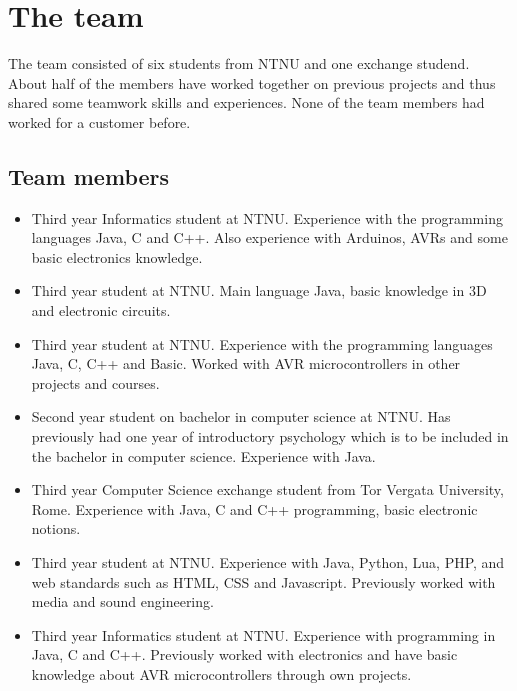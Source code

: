 \section{The team}
The team consisted of six students from NTNU and one exchange studend.
About half of the members have worked together on previous projects and thus shared
some teamwork skills and experiences. None of the team members had worked for a customer before.

\subsection{Team members}

\begin{itemize}
\item{\anders}\newline
Third year Informatics student at NTNU. Experience with the programming languages Java,
C and C++. Also experience with Arduinos, AVRs and some basic electronics knowledge.

\item{\henrik}\newline
Third year student at NTNU. Main language Java, basic knowledge in 3D and electronic circuits.

\item{\johan}\newline
Third year student at NTNU. Experience with the programming languages Java, C, C++  and
Basic. Worked with AVR microcontrollers in other projects and courses.

\item{\asbjorn}\newline
Second year student on bachelor in computer science at NTNU. Has previously had one year of
introductory psychology which is to be included in the bachelor in computer science.
Experience with Java.

\item{\emanuele}\newline
Third year Computer Science exchange student from Tor Vergata University, Rome.
Experience with Java, C and C++ programming, basic electronic notions.

\item{\jonas}\newline
Third year student at NTNU. Experience with Java, Python, Lua, PHP, and web standards such as HTML,
CSS and Javascript. Previously worked with media and sound engineering.

\item{\bjornar}\newline
Third year Informatics student at NTNU. Experience with programming in Java, C and C++.
Previously worked with electronics and have basic knowledge about AVR microcontrollers through
own projects.
\end{itemize}

